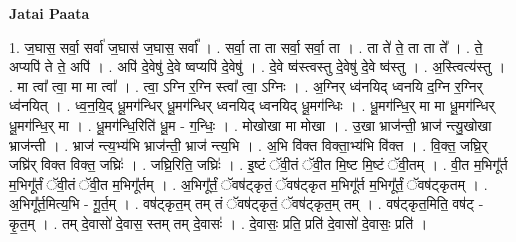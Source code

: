 \documentclass[17pt]{extarticle}
\begin{document}
\textbf{Jatai Paata} \newline

1. ज॒घास॒ सर्वा॒ सर्वा॑ ज॒घास॑ ज॒घास॒ सर्वा᳚ । . सर्वा॒ ता ता सर्वा॒ सर्वा॒ ता । . ता ते॑ ते॒ ता ता ते᳚ । . ते॒ अप्यपि॑ ते ते॒ अपि॑ । . अपि॑ दे॒वेषु॑ दे॒वे ष्वप्यपि॑ दे॒वेषु॑ । . दे॒वे ष्व॑स्त्वस्तु दे॒वेषु॑ दे॒वे ष्व॑स्तु । . अ॒स्त्वित्य॑स्तु । . मा त्वा᳚ त्वा॒ मा मा त्वा᳚ । . त्वा॒ ऽग्नि र॒ग्नि स्त्वा᳚ त्वा॒ ऽग्निः । . अ॒ग्निर् ध्व॑नयिद् ध्वनयि द॒ग्नि र॒ग्निर् ध्व॑नयित् । . ध्व॒न॒यि॒द् धू॒मग॑न्धिर् धू॒मग॑न्धिर् ध्वनयिद् ध्वनयिद् धू॒मग॑न्धिः । . धू॒मग॑न्धि॒र् मा मा धू॒मग॑न्धिर् धू॒मग॑न्धि॒र् मा । . धू॒मग॑न्धि॒रिति॑ धू॒म - ग॒न्धिः॒ । . मोखोखा मा मोखा । . उ॒खा भ्राज॑न्ती॒ भ्राज॑ न्त्यु॒खोखा भ्राज॑न्ती । . भ्राज॑ न्त्य॒भ्य॑भि भ्राज॑न्ती॒ भ्राज॑ न्त्य॒भि । . अ॒भि वि॑क्त विक्ता॒भ्य॑भि वि॑क्त । . वि॒क्त॒ जघ्रि॒र् जघ्रि॑र् विक्त विक्त॒ जघ्रिः॑ । . जघ्रि॒रिति॒ जघ्रिः॑ । . इ॒ष्टं ॅवी॒तं ॅवी॒त मि॒ष्ट मि॒ष्टं ॅवी॒तम् । . वी॒त म॒भिगू᳚र्त म॒भिगू᳚र्तं ॅवी॒तं ॅवी॒त म॒भिगू᳚र्तम् । . अ॒भिगू᳚र्तं॒ ॅवष॑ट्कृतं॒ ॅवष॑ट्कृत म॒भिगू᳚र्त म॒भिगू᳚र्तं॒ ॅवष॑ट्कृतम् । . अ॒भिगू᳚र्त॒मित्य॒भि - गू॒र्त॒म् । . वष॑ट्कृत॒म् तम् तं ॅवष॑ट्कृतं॒ ॅवष॑ट्कृत॒म् तम् । . वष॑ट्कृत॒मिति॒ वष॑ट् - कृ॒त॒म् । . तम् दे॒वासो॑ दे॒वास॒ स्तम् तम् दे॒वासः॑ । . दे॒वासः॒ प्रति॒ प्रति॑ दे॒वासो॑ दे॒वासः॒ प्रति॑ । \newline
\end{document}
